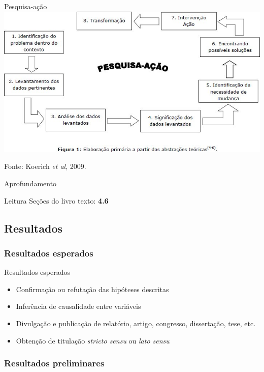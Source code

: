 \documentclass{beamer}
\begin{document}
\begin{frame}{Pesquisa-ação}
  \includegraphics[width=\textwidth]{EstruturaI/pesquisa-acao}

  \vfill
  \scriptsize
  Fonte: Koerich {\em et al}, 2009.
\end{frame}

\begin{frame}{Aprofundamento}
  \begin{block}{Leitura}
    Seções do livro texto: {\bf 4.6}
  \end{block}
\end{frame}

\subsection{Resultados}

\subsubsection{Resultados esperados}

\begin{frame}{Resultados esperados}
  \begin{itemize}
    \footnotesize
  \item Confirmação ou refutação das hipóteses descritas
  \bigskip
  \item Inferência de causalidade entre variáveis
  \bigskip
  \item Divulgação e publicação de relatório, artigo, congresso,
    dissertação, tese, etc.
  \bigskip
  \item Obtenção de titulação {\em stricto sensu} ou {\em lato sensu}
  \end{itemize}
\end{frame}

\subsubsection{Resultados preliminares}
\end{document}

